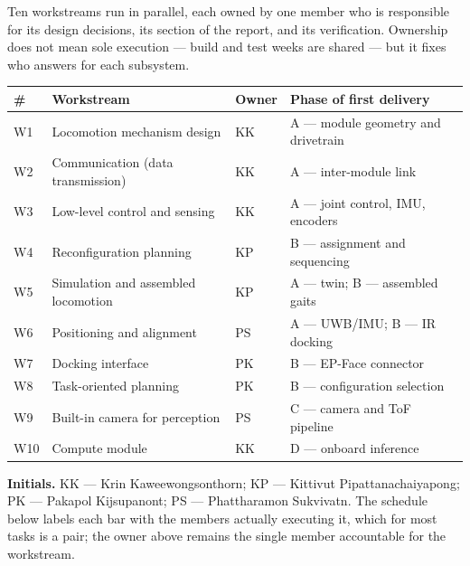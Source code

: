 \documentclass[11pt,a4paper]{article}
\newif\ifreview
\newcommand{\pending}[1]{\ifreview{\color{blue}#1}\else#1\fi}
\newenvironment{pblock}{\ifreview\color{blue}\fi}{}
\newcounter{gsec}
\newcounter{gsub}
\newcommand{\curgsec}{}
\newcommand{\gsep}{\texorpdfstring{\quad}{ }}
\newcommand{\gtocsub}[2]{%
  \phantomsection
  \addcontentsline{toc}{subsection}{#1\gsep #2}%
}
\newcommand{\gsubsection}[1]{%
  \refstepcounter{gsub}%
  \edef\gsublbl{\curgsec.\thegsub}%
  \expandafter\gtocsub\expandafter{\gsublbl}{#1}%
  \subsection*{\gsublbl\quad #1}%
}
\begin{document}
\pending{}

\pending{%
Ten workstreams run in parallel, each owned by one member who is responsible
for its design decisions, its section of the report, and its verification.
Ownership does not mean sole execution --- build and test weeks are shared ---
but it fixes who answers for each subsystem.
}

\begin{pblock}
\begin{longtable}{@{}l L{0.34\textwidth} l L{0.34\textwidth}@{}}
\toprule
\textbf{\#} & \textbf{Workstream} & \textbf{Owner} & \textbf{Phase of first delivery} \\
\midrule
\endhead
W1  & Locomotion mechanism design        & KK   & A --- module geometry and drivetrain \\
W2  & Communication (data transmission)  & KK   & A --- inter-module link \\
W3  & Low-level control and sensing      & KK   & A --- joint control, IMU, encoders \\
W4  & Reconfiguration planning           & KP   & B --- assignment and sequencing \\
W5  & Simulation and assembled locomotion& KP   & A --- twin; B --- assembled gaits \\
W6  & Positioning and alignment          & PS   & A --- UWB/IMU; B --- IR docking \\
W7  & Docking interface                  & PK   & B --- EP-Face connector \\
W8  & Task-oriented planning             & PK   & B --- configuration selection \\
W9  & Built-in camera for perception     & PS   & C --- camera and ToF pipeline \\
W10 & Compute module                     & KK   & D --- onboard inference \\
\bottomrule
\end{longtable}
\end{pblock}

\pending{%
\noindent\textbf{Initials.} KK --- Krin Kaweewongsonthorn; KP --- Kittivut
Pipattanachaiyapong; PK --- Pakapol Kijsupanont; PS --- Phattharamon Sukvivatn.
The schedule below labels each bar with the members actually executing it,
which for most tasks is a pair; the owner above remains the single member
accountable for the workstream.
}
\end{document}
